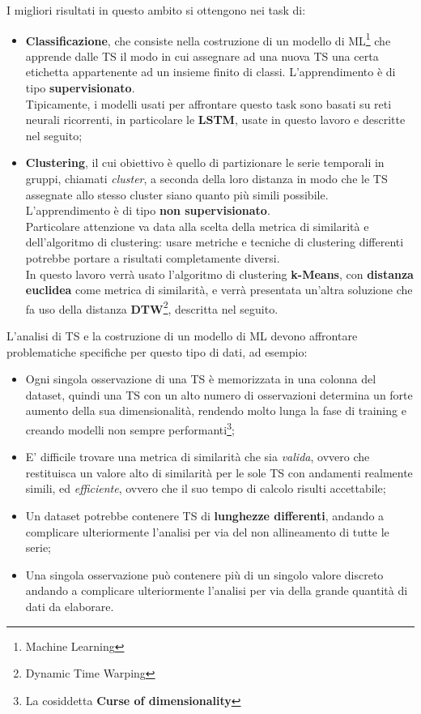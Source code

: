I migliori risultati in questo ambito si ottengono nei task di:
\begin{itemize}
	\item \textbf{Classificazione}, che consiste nella costruzione di un modello di ML\footnote{Machine Learning} che apprende dalle TS il modo in cui assegnare ad una nuova TS una certa etichetta appartenente ad un insieme finito di classi. L'apprendimento è di tipo \textbf{supervisionato}.\\
	Tipicamente, i modelli usati per affrontare questo task sono basati su reti neurali ricorrenti, in particolare le \textbf{LSTM}, usate in questo lavoro e descritte nel seguito;
	
	\item \textbf{Clustering}, il cui obiettivo è quello di partizionare le serie temporali in gruppi, chiamati \textit{cluster}, a seconda della loro distanza in modo che le TS assegnate allo stesso cluster siano quanto più simili possibile. L'apprendimento è di tipo \textbf{non supervisionato}.\\
	Particolare attenzione va data alla scelta della metrica di similarità e dell'algoritmo di clustering: usare metriche e tecniche di clustering differenti potrebbe portare a risultati completamente diversi.\\
	In questo lavoro verrà usato l'algoritmo di clustering \textbf{k-Means}, con \textbf{distanza euclidea} come metrica di similarità, e verrà presentata un'altra soluzione che fa uso della distanza \textbf{DTW}\footnote{Dynamic Time Warping}, descritta nel seguito.
	
\end{itemize}
L'analisi di TS e la costruzione di un modello di ML devono affrontare problematiche specifiche per questo tipo di dati, ad esempio:
\begin{itemize}
	\item Ogni singola osservazione di una TS è memorizzata in una colonna del dataset, quindi una TS con un alto numero di osservazioni determina un forte aumento della sua dimensionalità, rendendo molto lunga la fase di training e creando modelli non sempre performanti\footnote{La cosiddetta \textbf{Curse of dimensionality}};
	\item E' difficile trovare una metrica di similarità che sia \textit{valida}, ovvero che restituisca un valore alto di similarità per le sole TS con andamenti realmente simili, ed \textit{efficiente}, ovvero che il suo tempo di calcolo risulti accettabile;
	\item Un dataset potrebbe contenere TS di \textbf{lunghezze differenti}, andando a complicare ulteriormente l'analisi per via del non allineamento di tutte le serie;
	\item Una singola osservazione può contenere più di un singolo valore discreto andando a complicare ulteriormente l'analisi per via della grande quantità di dati da elaborare.
\end{itemize}

